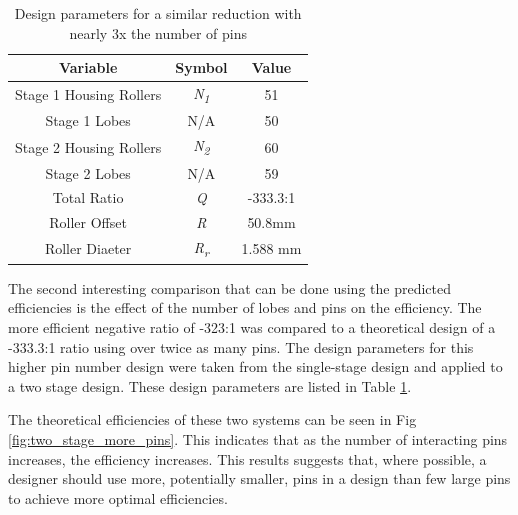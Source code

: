 \begin{table}[t]
  \vskip0.2cm
  \caption{Design parameters for a similar reduction with nearly 3x the number of pins}
  \label{table:two_stage_high_pins}
  \begin{center}
    \vskip-0.2cm
	\begin{tabular}{|c|c|c|}
		\hline
		Variable & Symbol & Value\\
		\hline
		Stage 1 Housing Rollers & \textit{N\textsubscript{1}} & 51\\
		\hline
		Stage 1 Lobes & N/A & 50\\
		\hline
		Stage 2 Housing Rollers & \textit{N\textsubscript{2}} & 60\\
		\hline
		Stage 2 Lobes & N/A & 59\\
		\hline
		Total Ratio & \textit{Q} & -333.3:1 \\
		\hline
		Roller Offset & \textit{R} & 50.8mm \\
		\hline
		Roller Diaeter & \textit{R\textsubscript{r}} & 1.588 mm\\
		\hline
	\end{tabular}
  \end{center}
\end{table}

The second interesting comparison that can be done using the predicted efficiencies is the effect of the number of lobes and pins on the efficiency. The more efficient negative ratio of -323:1 was compared to a theoretical design of a -333.3:1 ratio using over twice as many pins. The design parameters for this higher pin number design were taken from the single-stage design and applied to a two stage design. These design parameters are listed in Table \ref{table:two_stage_high_pins}. 


The theoretical efficiencies of these two systems can be seen in Fig \ref{fig:two_stage_more_pins}. This indicates that as the number of interacting pins increases, the efficiency increases. This results suggests that, where possible, a designer should use more, potentially smaller, pins in a design than few large pins to achieve more optimal efficiencies. 

